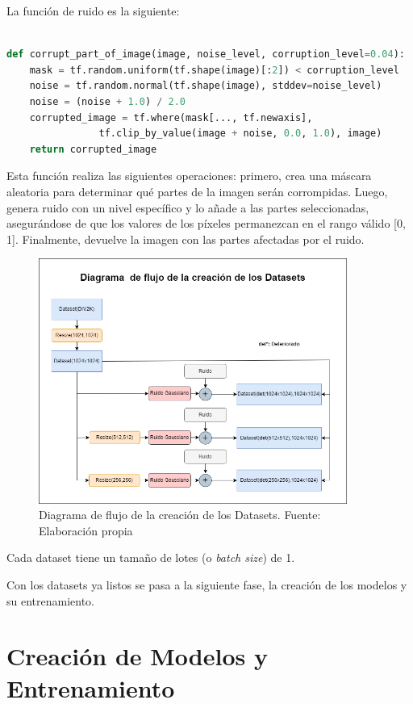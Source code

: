 La función de ruido es la siguiente:

\begin{lstlisting}[language=python]
	
def corrupt_part_of_image(image, noise_level, corruption_level=0.04):
	mask = tf.random.uniform(tf.shape(image)[:2]) < corruption_level
	noise = tf.random.normal(tf.shape(image), stddev=noise_level)
	noise = (noise + 1.0) / 2.0
	corrupted_image = tf.where(mask[..., tf.newaxis],
				tf.clip_by_value(image + noise, 0.0, 1.0), image)
	return corrupted_image
\end{lstlisting}

Esta función realiza las siguientes operaciones: primero, crea una máscara aleatoria para determinar qué partes de la imagen serán corrompidas. Luego, genera ruido con un nivel específico y lo añade a las partes seleccionadas, asegurándose de que los valores de los píxeles permanezcan en el rango válido [0, 1]. Finalmente, devuelve la imagen con las partes afectadas por el ruido.

\begin{figure}[H]
	\centering
	\includegraphics[width=0.9\textwidth]{figures/flow_diagram_datasets.png}
	\caption{\label{fig:datasets}Diagrama de flujo de la creación de los Datasets. Fuente: Elaboración propia}
\end{figure}

Cada dataset tiene un tamaño de lotes (o \textit{batch size}) de 1. 

Con los datasets ya listos se pasa a la siguiente fase, la creación de los modelos y su entrenamiento.

\section{Creación de Modelos y Entrenamiento}

